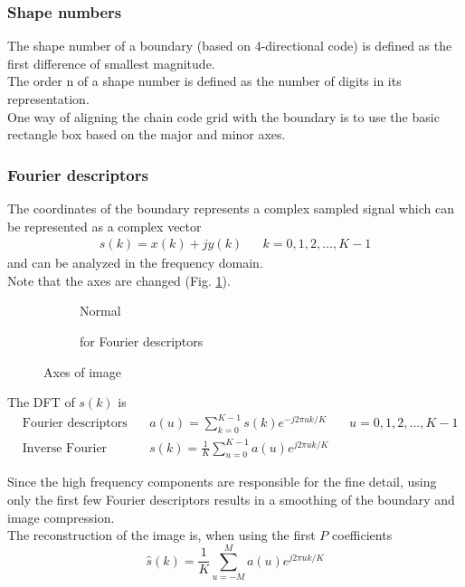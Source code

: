 \subsubsection{Shape numbers}
The shape number of a boundary (based on 4-directional code) is defined as the first difference of smallest magnitude.\\
The order n of a shape number is defined as the number of digits in its representation.\\
One way of aligning the chain code grid with the boundary is to use the basic rectangle box based on the major and minor axes.

\subsubsection{Fourier descriptors}
The coordinates of the boundary represents a complex sampled signal which can be represented as a complex vector
\begin{align*}
s(k)=x(k)+jy(k) && k=0,1,2,\ldots,K-1
\end{align*}
and can be analyzed in the frequency domain.\\

Note that the axes are changed (Fig. \ref{fig:axes}).
\begin{figure}[h]
	\begin{subfigure}{0.5\textwidth}
		 \centering
		 
		 \caption{Normal}
	\end{subfigure}
	\begin{subfigure}{0.5\textwidth}
		\centering
		
		\caption{for Fourier descriptors}
	\end{subfigure}
	\caption{Axes of image}
  \label{fig:axes}
\end{figure}

The DFT of $s(k)$ is \begin{align*}
& \text{Fourier descriptors of the boundary:} && a(u)=\sum\limits_{k=0}^{K-1}s(k)e^{-j2\pi uk/K} && u=0,1,2,\ldots,K-1\\
& \text{Inverse Fourier transform:} && s(k)=\frac{1}{K}\sum\limits_{u=0}^{K-1}a(u)e^{j2\pi uk/K}
\end{align*}

Since the high frequency components are responsible for the fine detail, using only the first few Fourier descriptors results in a smoothing of the boundary and image compression.\\
The reconstruction of the image is, when using the first $P$ coefficients
	\[
	\hat{s}(k) = \frac{1}{K} \sum\limits_{u=-M}^{M} a(u) e^{j 2 \pi u k / K}
	\]

